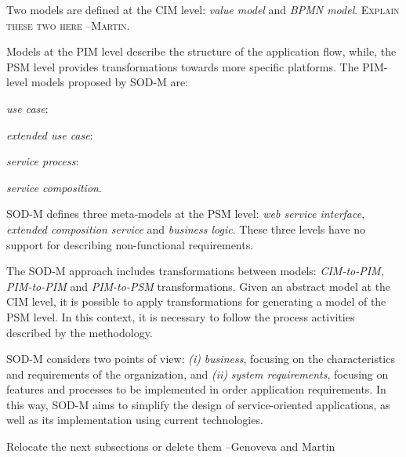 Two models are defined at the CIM level: \textit{value model}
and \textit{BPMN model}.
\textsc{Explain these two here --Martin.}

Models at the PIM level describe the structure of the application flow,
while, the PSM level provides transformations towards more specific platforms.
The PIM-level models proposed by SOD-M are:
\begin{trivlist}
\item \textit{use case}:
\item \textit{extended use case}:
\item \textit{service process}:
\item \textit{service composition}.
\end{trivlist}

SOD-M defines three meta-models at the PSM level: \textit{web service interface}, \textit{extended composition service} and \textit{business logic}.
These three levels have no support for describing non-functional requirements.

The SOD-M approach includes transformations between models:
\textit{CIM-to-PIM, PIM-to-PIM} and \textit{PIM-to-PSM} transformations. Given
an abstract model at the CIM level, it is possible to apply transformations for
generating a model of the PSM level. In this context, it is necessary to
follow the process activities described by the methodology.

SOD-M considers two points of view:
\textit{(i)} \textit{business}, focusing on the characteristics and requirements
of the organization, and \textit{(ii)} \textit{system requirements}, focusing on
features and processes to be implemented in order application requirements. In
this way, SOD-M aims to simplify the design of service-oriented applications, as
well as its implementation using current technologies. 

{\LARGE \color{red} Relocate the next subsections or delete them --Genoveva and Martin}



